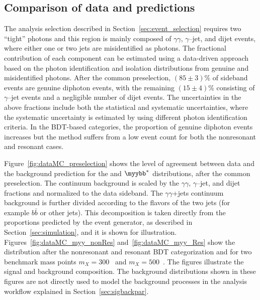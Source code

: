 \documentclass[PAPER, cernpreprint, texlive=2016, paper=a4, USenglish, texmf]{atlasdoc}
\begin{document}
\subsection{Comparison of data and predictions}
\label{sec:background_diphoton}
 
The analysis selection described in Section~\ref{sec:event_selection} requires two ``tight'' photons and this region is mainly composed of $\gamma \gamma$, $\gamma$--jet, and dijet events, where either one or two jets are misidentified as photons.
The fractional contribution of each component can be estimated using a data-driven approach~\cite{STDM-2012-05} based on the photon identification and isolation distributions from genuine and misidentified photons.
After the common preselection, $(85 \pm 3)$\% of sideband events are genuine diphoton events, with the remaining $(15 \pm 4)$\% consisting of $\gamma$--jet events and a negligible number of dijet events. The uncertainties in the above fractions include both the statistical and systematic uncertainties, where the systematic uncertainty is estimated by using different photon identification criteria.
In the BDT-based categories, the proportion of genuine diphoton events increases but the method suffers from a low event count for both the nonresonant and resonant cases. 
 
Figure~\ref{fig:dataMC_preselection} shows the level of agreement between data and the background prediction for the \myy and $\myybb^{*}$ distributions, after the common preselection.
The continuum background is scaled by the $\gamma \gamma$, $\gamma$--jet, and dijet fractions and normalized to the data sideband.
The $\gamma \gamma$+jets continuum background is further divided according to the flavors of the two jets (for example $b\bar{b}$ or other jets). This decomposition is taken directly from the proportions predicted by the \SHERPA event generator, as described in Section~\ref{sec:simulation}, and it is shown for illustration.
Figures~\ref{fig:dataMC_myy_nonRes} and~\ref{fig:dataMC_myy_Res} show the \myy distribution after the nonresonant and resonant BDT categorization and for two benchmark mass points $m_X = 300$~\GeV{} and $m_X = 500$~\GeV.
The figures illustrate the signal and background composition. The background distributions shown in these figures are not directly used to model the background processes in the analysis workflow  explained in Section~\ref{sec:sigbackpar}.
 
\end{document}
